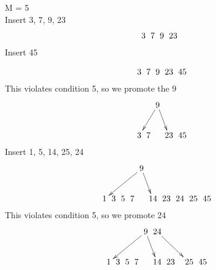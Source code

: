 \documentclass[a4paper]{article}
\begin{document}

M = 5 \\
Insert 3, 7, 9, 23 \\
$$\xymatrix @C=0pt {
 & &  &  & 3 & 7 & 9 & 23 &  &  &  \\
}$$
Insert 45

$$\xymatrix @C=0pt {
 & &  &  & 3 & 7 & 9 & 23 & 45 &  &  \\
}$$
This violates condition 5, so we promote the 9 \\
$$\xymatrix @C=0pt {
& &  &  &    &   & \ar[dll] 9 \ar[dr] & &   &  &  \\
 & &  &  & 3 & 7 &  & 23 & 45 &  &  \\
}$$
Insert 1, 5, 14, 25, 24
$$\xymatrix @C=0pt {
& &  &  &    &   & \ar[dllll] 9 \ar[dr] & &   &  &  \\
 &  & 1 & 3 & 5 & 7 &  & 14 & 23 & 24 & 25 & 45 &  &  \\
}$$
This violates condition 5, so we promote 24
$$\xymatrix @C=0pt {
& &  &  &    &   & \ar[dllll] 9 \ar[dr] & 24\ar[drrr] &   &  &  \\
 &  & 1 & 3 & 5 & 7 &  & 14 & 23 &   & 25 & 45 &  &  \\
}$$
\end{document}
